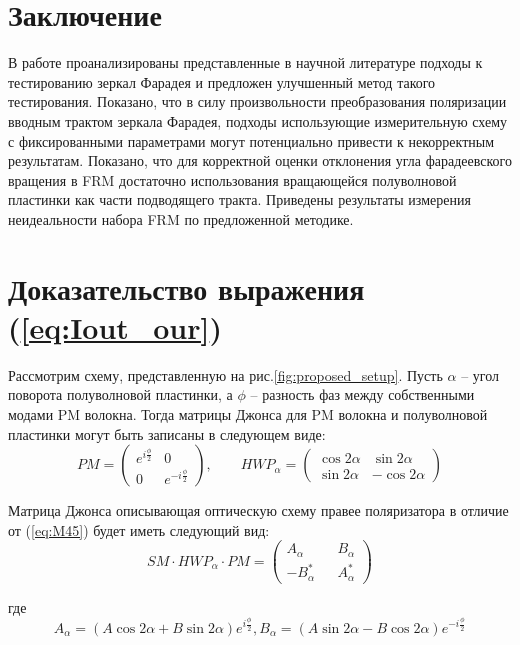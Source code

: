 \documentclass{article}
\begin{document}
\section{Заключение}
В работе проанализированы представленные в научной литературе подходы к тестированию зеркал Фарадея и предложен улучшенный метод такого тестирования. Показано, что в силу произвольности преобразования поляризации вводным трактом зеркала Фарадея, подходы использующие измерительную схему с фиксированными параметрами могут потенциально привести к некорректным результатам. Показано, что для корректной оценки отклонения угла фарадеевского вращения в FRM достаточно использования вращающейся полуволновой пластинки как части подводящего тракта. Приведены результаты измерения неидеальности набора FRM по предложенной методике.

\appendix
{}
\section{Доказательство выражения (\ref{eq:Iout_our})}
Рассмотрим схему, представленную на рис.\ref{fig:proposed_setup}.  Пусть $\alpha$ – угол поворота полуволновой пластинки, а $\phi$ – разность фаз между собственными модами PM волокна. Тогда матрицы Джонса для PM волокна и полуволновой пластинки могут быть записаны в следующем виде:
\begin{equation}
	PM = 
	\begin{pmatrix}
		e^{i\frac{\phi}{2}} & 0 \\
		0 & e^{-i\frac{\phi}{2}}
	\end{pmatrix},\qquad 
	HWP_\alpha = 
	\begin{pmatrix}
		\cos 2 \alpha & \sin 2 \alpha \\
		\sin 2 \alpha & -\cos 2 \alpha
	\end{pmatrix}
\end{equation}

Матрица Джонса описывающая оптическую схему правее поляризатора в отличие от (\ref{eq:M45}) будет иметь следующий вид:
\begin{equation}
	SM \cdot HWP_\alpha \cdot PM =
	\begin{pmatrix} 
		A_\alpha 	&& 	B_\alpha \\
		-B_\alpha^* && 	A_\alpha^*
	\end{pmatrix}
\end{equation}

где
\begin{equation}
	\label{eq:alpha_def}
	A_\alpha = \left( A\cos2\alpha + B\sin2\alpha\right) e^{i\frac{\phi}{2}},
	B_\alpha = \left( A\sin2\alpha - B\cos2\alpha\right) e^{-i\frac{\phi}{2}}
\end{equation}
\end{document}
